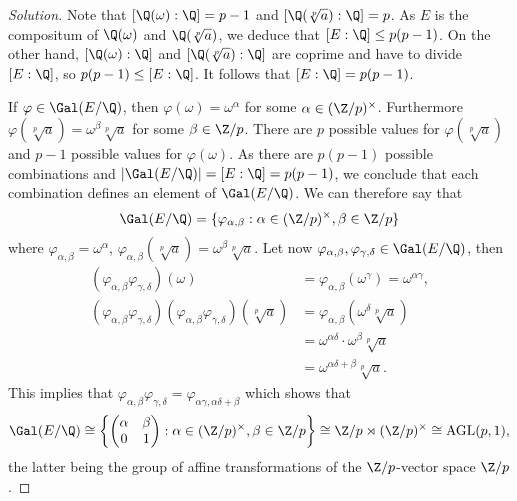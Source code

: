 \documentclass[a4paper,10pt,reqno]{amsart}
\newenvironment{sol}
  {\renewcommand\qedsymbol{$\blacksquare$}\begin{proof}[Solution]}
  {\end{proof}}
\begin{document}
\begin{sol}
    Note that $[\Q(\omega):\Q] = p-1$ and $[\Q(\sqrt[p]{a}):\Q] = p$. As $E$ is the compositum of $\Q(\omega)$ and $\Q(\sqrt[p]{a})$, we deduce that $[E:\Q] \leq p(p-1)$. On the other hand, $[\Q(\omega):\Q]$ and $[\Q(\sqrt[p]{a}):\Q]$ are coprime and have to divide $[E:\Q]$, so $p(p-1) \leq [E:\Q]$. It follows that $[E:\Q] = p(p-1)$.

    If $\varphi \in \Gal(E/\Q)$, then $\varphi(\omega) = \omega^{\alpha}$ for some $\alpha \in (\Z/p)^{\times}$. Furthermore $\varphi(\sqrt[p]{a}) = \omega^{\beta} \sqrt[p]{a}$ for some $\beta \in \Z/p$. There are $p$ possible values for $\varphi(\sqrt[p]{a})$ and $p-1$ possible values for $\varphi(\omega)$. As there are $p(p-1)$ possible combinations and $|\Gal(E/\Q)| = [E:\Q] = p(p-1)$, we conclude that each combination defines an element of $\Gal(E/\Q)$. We can therefore say that
    \[
    \Gal(E/\Q) = \{ \varphi_{\alpha,\beta} : \alpha \in (\Z/p)^{\times}, \beta \in \Z/p\}
    \]
    where $\varphi_{\alpha,\beta} = \omega^{\alpha}$, $\varphi_{\alpha,\beta}(\sqrt[p]{a}) = \omega^{\beta} \sqrt[p]{a}$. Let now $\varphi_{\alpha,\beta},\varphi_{\gamma,\delta} \in \Gal(E/\Q)$, then
    \begin{align*}
        (\varphi_{\alpha,\beta}\varphi_{\gamma,\delta})(\omega) & = \varphi_{\alpha,\beta}(\omega^{\gamma}) = \omega^{\alpha\gamma}, \\
        (\varphi_{\alpha,\beta}\varphi_{\gamma,\delta})(\varphi_{\alpha,\beta}\varphi_{\gamma,\delta})(\sqrt[p]{a}) & = \varphi_{\alpha,\beta} (\omega^{\delta}\sqrt[p]{a}) \\
        & = \omega^{\alpha\delta} \cdot \omega^{\beta} \sqrt[p]{a} \\
        & = \omega^{\alpha \delta + \beta} \sqrt[p]{a}.
    \end{align*}
    This implies that $\varphi_{\alpha,\beta}\varphi_{\gamma,\delta} = \varphi_{\alpha\gamma, \alpha\delta + \beta}$ which shows that
    \[
    \Gal(E/\Q) \cong \left\{ \begin{pmatrix} \alpha & \beta \\ 0 & 1 \end{pmatrix} : \alpha \in (\Z/p)^{\times}, \beta \in \Z/p \right\} \cong \Z/p \rtimes (\Z/p)^{\times} \cong \mathrm{AGL}(p,1),
    \]
    the latter being the group of affine transformations of the $\Z/p$-vector space $\Z/p$.
\end{sol}
\end{document}

